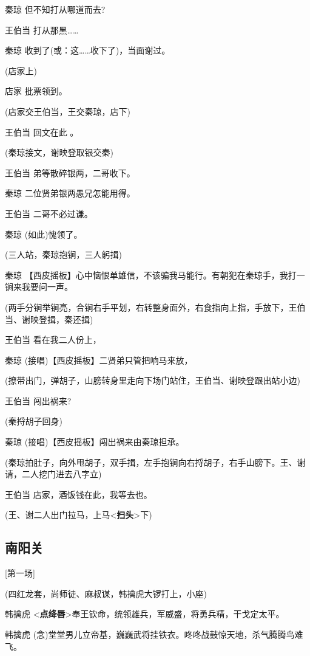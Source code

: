 秦琼 但不知打从哪道而去?

王伯当 打从那黑\ldots{}\ldots{}

秦琼 收到了(或：这\ldots{}\ldots{}收下了)，当面谢过。

(店家上)

店家 批票领到。

(店家交王伯当，王交秦琼，店下)

王伯当 回文在此 。

(秦琼接文，谢映登取银交秦)

王伯当 弟等散碎银两，二哥收下。

秦琼 二位贤弟银两愚兄怎能用得。

王伯当 二哥不必过谦。

秦琼 (如此)愧领了。

(三人站，秦琼抱锏，三人躬揖)

秦琼
【西皮摇板】心中恼恨单雄信，不该骗我马能行。有朝犯在秦琼手，我打一锏来我要问一声。

(两手分锏举锏亮，合锏右手平划，右转整身面外，右食指向上指，手放下，王伯当、谢映登揖，秦还揖)

王伯当 看在我二人份上，

秦琼 (接唱)【西皮摇板】二贤弟只管把响马来放，

(撩带出门，弹胡子，山膀转身里走向下场门站住，王伯当、谢映登跟出站小边)

王伯当 闯出祸来?

(秦捋胡子回身)

秦琼 (接唱)【西皮摇板】闯出祸来由秦琼担承。

(秦琼拍肚子，向外甩胡子，双手揖，左手抱锏向右捋胡子，右手山膀下。王、谢请，二人挖门进去八字立)

王伯当 店家，酒饭钱在此，我等去也。

(王、谢二人出门拉马，上马\textless{}\textbf{扫头}\textgreater{}下)

\hypertarget{ux5357ux9633ux5173}{%
\subsection{南阳关}\label{ux5357ux9633ux5173}}

{[}第一场{]}

(四红龙套，尚师徒、麻叔谋，韩擒虎大锣打上，小座)

韩擒虎
\textless{}\textbf{点绛唇}\textgreater{}奉王钦命，统领雄兵，军威盛，将勇兵精，干戈定太平。

韩擒虎
(念)堂堂男儿立帝基，巍巍武将挂铁衣。咚咚战鼓惊天地，杀气腾腾鸟难飞。

